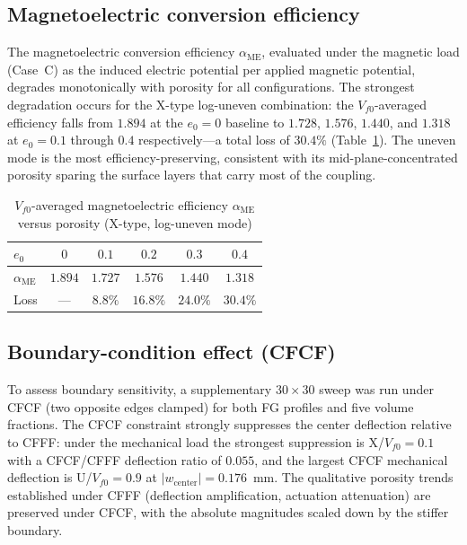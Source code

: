 \documentclass[11pt,a4paper]{article}
\begin{document}
\subsection{Magnetoelectric conversion efficiency}

The magnetoelectric conversion efficiency $\alpha_{\text{ME}}$, evaluated under the magnetic load (Case~C) as the induced electric potential per applied magnetic potential, degrades monotonically with porosity for all configurations. The strongest degradation occurs for the X-type log-uneven combination: the $V_{f0}$-averaged efficiency falls from $1.894$ at the $e_0=0$ baseline to $1.728$, $1.576$, $1.440$, and $1.318$ at $e_0 = 0.1$ through $0.4$ respectively---a total loss of $30.4\%$ (Table~\ref{tab:me-eff}). The uneven mode is the most efficiency-preserving, consistent with its mid-plane-concentrated porosity sparing the surface layers that carry most of the coupling.

\begin{table}[H]
\centering
\caption{$V_{f0}$-averaged magnetoelectric efficiency $\alpha_{\text{ME}}$ versus porosity (X-type, log-uneven mode)}
\label{tab:me-eff}
\begin{tabular}{lccccc}
\toprule
$e_0$ & $0$ & $0.1$ & $0.2$ & $0.3$ & $0.4$ \\
\midrule
$\alpha_{\text{ME}}$ & $1.894$ & $1.727$ & $1.576$ & $1.440$ & $1.318$ \\
Loss & --- & $8.8\%$ & $16.8\%$ & $24.0\%$ & $30.4\%$ \\
\bottomrule
\end{tabular}
\end{table}

\subsection{Boundary-condition effect (CFCF)}

To assess boundary sensitivity, a supplementary $30\times30$ sweep was run under CFCF (two opposite edges clamped) for both FG profiles and five volume fractions. The CFCF constraint strongly suppresses the center deflection relative to CFFF: under the mechanical load the strongest suppression is X/$V_{f0}=0.1$ with a CFCF/CFFF deflection ratio of $0.055$, and the largest CFCF mechanical deflection is U/$V_{f0}=0.9$ at $|w_{\text{center}}| = 0.176$~mm. The qualitative porosity trends established under CFFF (deflection amplification, actuation attenuation) are preserved under CFCF, with the absolute magnitudes scaled down by the stiffer boundary.
\end{document}
